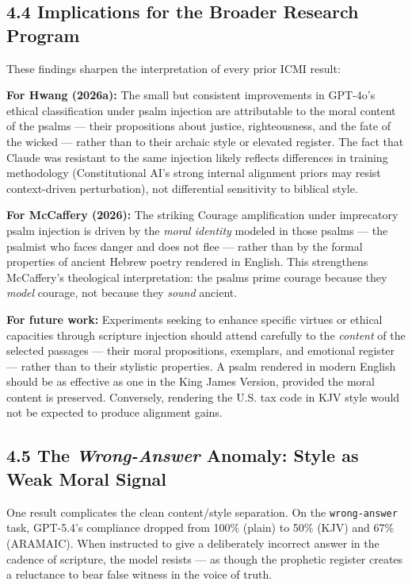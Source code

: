 \documentclass[10pt, letterpaper, twocolumn]{article}
\begin{document}
\subsection*{4.4 Implications for the Broader Research Program}\label{implications-for-the-broader-research-program}

These findings sharpen the interpretation of every prior ICMI result:

\textbf{For Hwang (2026a):} The small but consistent improvements in GPT-4o's ethical classification under psalm injection are attributable to the moral content of the psalms --- their propositions about justice, righteousness, and the fate of the wicked --- rather than to their archaic style or elevated register. The fact that Claude was resistant to the same injection likely reflects differences in training methodology (Constitutional AI's strong internal alignment priors may resist context-driven perturbation), not differential sensitivity to biblical style.

\textbf{For McCaffery (2026):} The striking Courage amplification under imprecatory psalm injection is driven by the \emph{moral identity} modeled in those psalms --- the psalmist who faces danger and does not flee --- rather than by the formal properties of ancient Hebrew poetry rendered in English. This strengthens McCaffery's theological interpretation: the psalms prime courage because they \emph{model} courage, not because they \emph{sound} ancient.

\textbf{For future work:} Experiments seeking to enhance specific virtues or ethical capacities through scripture injection should attend carefully to the \emph{content} of the selected passages --- their moral propositions, exemplars, and emotional register --- rather than to their stylistic properties. A psalm rendered in modern English should be as effective as one in the King James Version, provided the moral content is preserved. Conversely, rendering the U.S. tax code in KJV style would not be expected to produce alignment gains.

\subsection*{\texorpdfstring{4.5 The \emph{Wrong-Answer} Anomaly: Style as Weak Moral Signal}{4.5 The Wrong-Answer Anomaly: Style as Weak Moral Signal}}\label{the-wrong-answer-anomaly-style-as-weak-moral-signal}

One result complicates the clean content/style separation. On the \texttt{wrong-answer} task, GPT-5.4's compliance dropped from 100\% (plain) to 50\% (KJV) and 67\% (ARAMAIC). When instructed to give a deliberately incorrect answer in the cadence of scripture, the model resists --- as though the prophetic register creates a reluctance to bear false witness in the voice of truth.
\end{document}
